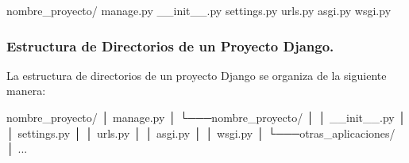 \documentclass[
  letterpaper,
  DIV=11,
  numbers=noendperiod]{scrartcl}
\newenvironment{Shaded}{\begin{snugshade}}{\end{snugshade}}
\newcommand{\NormalTok}[1]{\textcolor[rgb]{0.00,0.23,0.31}{#1}}
\begin{document}
\begin{Shaded}
\begin{Highlighting}[]
\NormalTok{nombre\_proyecto/}
\NormalTok{    manage.py}
\NormalTok{        \_\_init\_\_.py}
\NormalTok{        settings.py}
\NormalTok{        urls.py}
\NormalTok{        asgi.py}
\NormalTok{        wsgi.py}
\end{Highlighting}
\end{Shaded}

\hypertarget{estructura-de-directorios-de-un-proyecto-django.}{%
\subsubsection{Estructura de Directorios de un Proyecto
Django.}\label{estructura-de-directorios-de-un-proyecto-django.}}

La estructura de directorios de un proyecto Django se organiza de la
siguiente manera:

\begin{Shaded}
\begin{Highlighting}[]

\NormalTok{nombre\_proyecto/}
\NormalTok{│   manage.py}
\NormalTok{│}
\NormalTok{└───nombre\_proyecto/}
\NormalTok{│   │   \_\_init\_\_.py}
\NormalTok{│   │   settings.py}
\NormalTok{│   │   urls.py}
\NormalTok{│   │   asgi.py}
\NormalTok{│   │   wsgi.py}
\NormalTok{│}
\NormalTok{└───otras\_aplicaciones/}
\NormalTok{    │   ...}
\end{Highlighting}
\end{Shaded}
\end{document}
